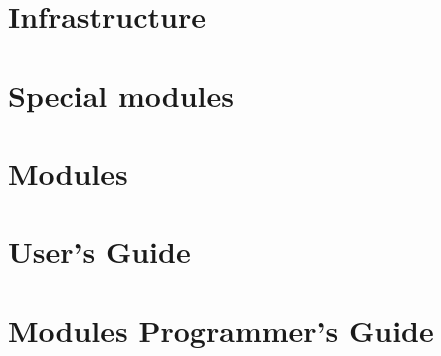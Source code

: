 \documentclass[a4paper, 11pt]{report}
\begin{document}

\tableofcontents


\chapter{Infrastructure}
%  
  
  
%  
%  
% 
  
  
  
%

\chapter{Special modules}
  
  

\chapter{Modules}
  
  
  

\chapter{User's Guide}
  
  
  

\chapter{Modules Programmer's Guide}
  
  
  
\end{document}
